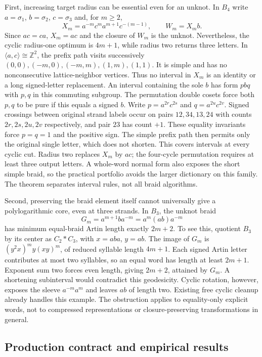 First, increasing target radius can be essential even for an unknot.
In $B_4$ write $a=\sigma_1$, $b=\sigma_2$, $c=\sigma_3$ and, for $m\ge2$,
\[
 X_m=a^{-m}c^m a^{m+1}c^{-(m-1)},\qquad W_m=X_m b.
\]
Since $ac=ca$, $X_m=ac$ and the closure of $W_m$ is the unknot.
Nevertheless, the cyclic radius-one optimum is $4m+1$, while radius two
returns three letters.  In $\langle a,c\rangle\cong\mathbb Z^2$, the
prefix path visits successively $(0,0),(-m,0),(-m,m),(1,m),(1,1)$.
It is simple and has no nonconsecutive lattice-neighbor vertices.  Thus
no interval in $X_m$ is an identity or a long signed-letter replacement.
An interval containing the sole $b$ has form $p b q$ with $p,q$ in this
commuting subgroup.  The permutation double cosets force both $p,q$ to
be pure if this equals a signed $b$.  Write $p=a^{2r}c^{2s}$ and
$q=a^{2u}c^{2v}$.  Signed crossings between original strand labels occur
on pairs $12,34,13,24$ with counts $2r,2s,2u,2v$ respectively, and pair
$23$ has count $+1$.  These equality invariants force $p=q=1$ and the
positive sign.  The simple prefix path then permits only the original
single letter, which does not shorten.  This covers intervals at every
cyclic cut.  Radius two replaces $X_m$ by $ac$; the four-cycle permutation
requires at least three output letters.  A whole-word normal form also
exposes the short simple braid, so the practical portfolio avoids the
larger dictionary on this family.  The theorem separates interval rules,
not all braid algorithms.

Second, preserving the braid element itself cannot universally give a
polylogarithmic core, even at three strands.  In $B_3$, the unknot braid
\[
 G_m=a^{m+1}ba^{-m}=a^m(ab)a^{-m}
\]
 has minimum equal-braid Artin length exactly $2m+2$.  To see this, quotient
$B_3$ by its center as $C_2*C_3$, with $x=aba$, $y=ab$.
The image of $G_m$ is $(y^2x)^m y(xy)^m$, of reduced syllable length
$4m+1$.  Each signed Artin letter contributes at most two syllables, so
an equal word has length at least $2m+1$.  Exponent sum two forces even
length, giving $2m+2$, attained by $G_m$.  A shortening subinterval would
contradict this geodesicity.  Cyclic rotation, however, exposes the sleeve
$a^{-m}a^m$ and leaves $ab$ of length two.  Existing free cyclic cleanup
already handles this example.  The obstruction applies to equality-only
explicit words, not to compressed representations or closure-preserving
transformations in general.

\subsection{Production contract and empirical results}


